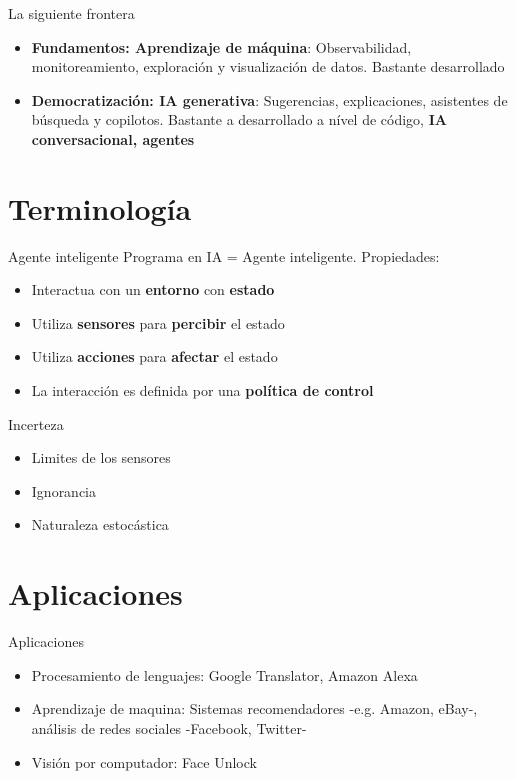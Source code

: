 \documentclass[aspectratio=169]{beamer}
\begin{document}
\begin{frame}{La siguiente frontera}
	\begin{itemize}
		\item \textbf{Fundamentos: Aprendizaje de máquina}: Observabilidad, monitoreamiento, exploración y visualización de datos. Bastante desarrollado
		\item \textbf{Democratización: IA generativa}: Sugerencias, explicaciones, asistentes de búsqueda y copilotos. Bastante a desarrollado a nível de código, \textbf{IA conversacional, agentes}
	\end{itemize}
\end{frame}

\section{Terminología}
\begin{frame}{Agente inteligente}
Programa en IA = Agente inteligente.
Propiedades:
\begin{itemize}
\item Interactua con un \textbf{entorno} con \textbf{estado}
\item Utiliza \textbf{sensores} para \textbf{percibir} el estado
\item Utiliza \textbf{acciones} para \textbf{afectar} el estado
\item La interacción es definida por una \textbf{política de control}
\end{itemize}
\end{frame}

\begin{frame}{Incerteza}
\begin{itemize}
\item Limites de los sensores
\item Ignorancia
\item Naturaleza estocástica
\end{itemize}
\end{frame}


\section*{Aplicaciones}
\begin{frame}{Aplicaciones}
\begin{itemize}
\item Procesamiento de lenguajes: Google Translator, Amazon Alexa
\item Aprendizaje de maquina: Sistemas recomendadores -e.g. Amazon, eBay-, análisis de redes sociales -Facebook, Twitter-
\item Visión por computador: Face Unlock
\end{itemize}
\end{frame}
\end{document}
